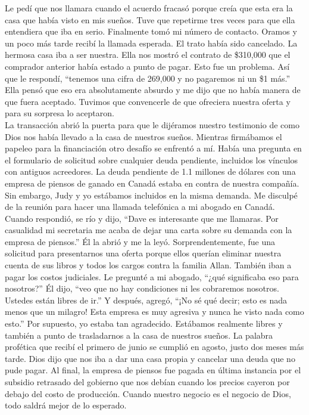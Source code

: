 \documentclass[twoside, 12pt]{book}
\begin{document}
Le pedí que nos llamara cuando el acuerdo fracasó porque creía que esta era la casa que había visto en mis sueños. Tuve que repetirme tres veces para que ella entendiera que iba en serio. Finalmente tomó mi número de contacto. Oramos y un poco más tarde recibí la llamada esperada. El trato había sido cancelado. La hermosa casa iba a ser nuestra. Ella nos mostró el contrato de \$310,000 que el comprador anterior había estado a punto de pagar. Esto fue un problema. Así que le respondí, “tenemos una cifra de 269,000 y no pagaremos ni un \$1 más.” Ella pensó que eso era absolutamente absurdo y me dijo que no había manera de que fuera aceptado. Tuvimos que convencerle de que ofreciera nuestra oferta y para su sorpresa lo aceptaron.\\

La transacción abrió la puerta para que le dijéramos nuestro testimonio de como Dios nos había llevado a la casa de nuestros sueños. Mientras firmábamos el papeleo para la financiación otro desafío se enfrentó a mí. Había una pregunta en el formulario de solicitud sobre cualquier deuda pendiente, incluidos los vínculos con antiguos acreedores. La deuda pendiente de 1.1 millones de dólares con una empresa de piensos de ganado en Canadá estaba en contra de nuestra compañía. Sin embargo, Judy y yo estábamos incluidos en la misma demanda. Me disculpé de la reunión para hacer una llamada telefónica a mi abogado en Canadá. Cuando respondió, se río y dijo, “Dave es interesante que me llamaras. Por casualidad mi secretaria me acaba de dejar una carta sobre su demanda con la empresa de piensos.”  Él la abrió y me la leyó.  Sorprendentemente, fue una solicitud para presentarnos una oferta porque ellos querían eliminar nuestra cuenta de sus libros y todos los cargos contra la familia Allan.  También iban a pagar los costos judiciales.  Le pregunté a mi abogado, “¿qué significaba eso para nosotros?”  Él dijo, “veo que no hay condiciones ni les cobraremos nosotros. Ustedes están libres de ir.” Y después, agregó, “¡No sé qué decir; esto es nada menos que un milagro!  Esta empresa es muy agresiva y nunca he visto nada como esto.”  Por supuesto, yo estaba tan agradecido.
Estábamos realmente libres y también a punto de trasladarnos a la casa de nuestros sueños. La palabra profética que recibí el primero de junio se cumplió en agosto, justo dos meses más tarde. Dios dijo que nos iba a dar una casa propia y cancelar una deuda que no pude pagar. Al final, la empresa de piensos fue pagada en última instancia por el subsidio retrasado del gobierno que nos debían cuando los precios cayeron por debajo del costo de producción. Cuando nuestro negocio es el negocio de Dios, todo saldrá mejor de lo esperado.\\
\end{document}
